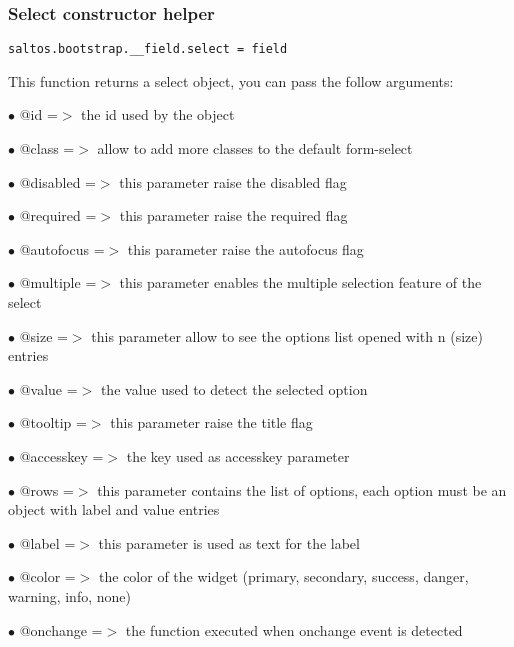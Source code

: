 \documentclass[a4paper]{article}
\begin{document}
\hypertarget{toc621}{}
\subsubsection{Select constructor helper}

\begin{lstlisting}
saltos.bootstrap.__field.select = field
\end{lstlisting}

This function returns a select object, you can pass the follow arguments:

\begin{compactitem}
\item[\color{myblue}$\bullet$] @id        =$>$ the id used by the object
\item[\color{myblue}$\bullet$] @class     =$>$ allow to add more classes to the default form-select
\item[\color{myblue}$\bullet$] @disabled  =$>$ this parameter raise the disabled flag
\item[\color{myblue}$\bullet$] @required  =$>$ this parameter raise the required flag
\item[\color{myblue}$\bullet$] @autofocus =$>$ this parameter raise the autofocus flag
\item[\color{myblue}$\bullet$] @multiple  =$>$ this parameter enables the multiple selection feature of the select
\item[\color{myblue}$\bullet$] @size      =$>$ this parameter allow to see the options list opened with n (size) entries
\item[\color{myblue}$\bullet$] @value     =$>$ the value used to detect the selected option
\item[\color{myblue}$\bullet$] @tooltip   =$>$ this parameter raise the title flag
\item[\color{myblue}$\bullet$] @accesskey =$>$ the key used as accesskey parameter
\item[\color{myblue}$\bullet$] @rows      =$>$ this parameter contains the list of options, each option must be an object
              with label and value entries
\item[\color{myblue}$\bullet$] @label     =$>$ this parameter is used as text for the label
\item[\color{myblue}$\bullet$] @color     =$>$ the color of the widget (primary, secondary, success, danger, warning, info, none)
\item[\color{myblue}$\bullet$] @onchange  =$>$ the function executed when onchange event is detected
\end{compactitem}
\end{document}
